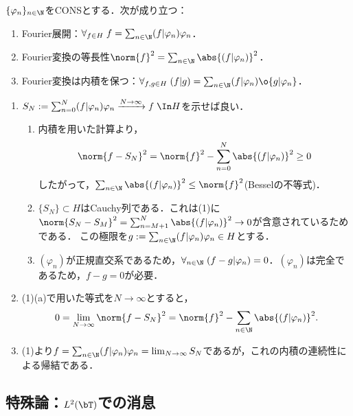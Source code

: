 \documentclass[uplatex,dvipdfmx]{jsreport}
\begin{document}
\begin{proposition}
    $\{\varphi_n\}_{n\in\N}$をCONSとする．次が成り立つ：
    \begin{enumerate}
        \item Fourier展開：$\forall_{f\in H}\;f=\sum_{n\in\N}(f|\varphi_n)\varphi_n$．
        \item Fourier変換の等長性$\norm{f}^2=\sum_{n\in\N}\abs{(f|\varphi_n)}^2$．
        \item Fourier変換は内積を保つ：$\forall_{f,g\in H}\;(f|g)=\sum_{n\in\N}(f|\varphi_n)\o{g|\varphi_n}$．
    \end{enumerate}
\end{proposition}
\begin{Proof}\mbox{}
    \begin{enumerate}
        \item $S_N:=\sum_{n=0}^N(f|\varphi_n)\varphi_n\xrightarrow{N\to\infty}f\;\In H$を示せば良い．
        \begin{enumerate}
            \item 内積を用いた計算より，
            \[\norm{f-S_N}^2=\norm{f}^2-\sum_{n=0}^N\abs{(f|\varphi_n)}^2\ge0\]
            したがって，$\sum_{n\in\N}\abs{(f|\varphi_n)}^2\le\norm{f}^2$(Besselの不等式)．
            \item $\{S_N\}\subset H$はCauchy列である．これは(1)に$\norm{S_N-S_M}^2=\sum_{n=M+1}^N\abs{(f|\varphi_n)}^2\to0$が含意されているためである．
            この極限を$g:=\sum_{n\in\N}(f|\varphi_n)\varphi_n\in H$とする．
            \item $(\varphi_n)$が正規直交系であるため，$\forall_{n\in\N}\;(f-g|\varphi_n)=0$．$(\varphi_n)$は完全であるため，$f-g=0$が必要．
        \end{enumerate}
        \item (1)(a)で用いた等式を$N\to\infty$とすると，
        \[0=\lim_{N\to\infty}\norm{f-S_N}^2=\norm{f}^2-\sum_{n\in\N}\abs{(f|\varphi_n)}^2.\]
        \item (1)より$f=\sum_{n\in\N}(f|\varphi_n)\varphi_n=\lim_{N\to\infty}S_N$であるが，これの内積の連続性による帰結である．
    \end{enumerate}
\end{Proof}

\subsection{特殊論：$L^2(\bT)$での消息}
\end{document}
